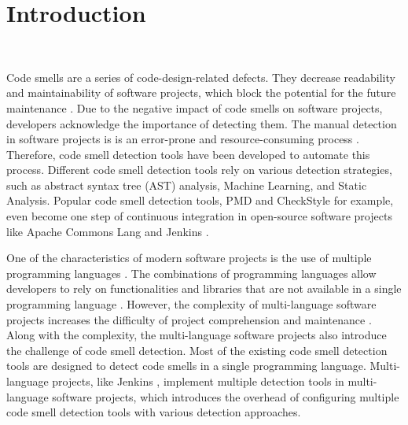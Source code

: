 \section{Introduction}~\label{sec:introduction}


Code smells are a series of code-design-related defects. They decrease
readability \cite{5741260} and maintainability \cite{6392174,6405287} of
software projects, which block the potential for the future maintenance
\cite{Fowler_Beck}. Due to the negative impact of code smells on software
projects, developers acknowledge the importance of detecting them. The manual
detection in software projects is is an error-prone and resource-consuming
process \cite{DetectingDefectsInObject}. Therefore, code smell detection tools
have been developed to automate this process. Different code smell detection
tools rely on various detection strategies, such as abstract syntax tree (AST)
analysis, Machine Learning, and Static Analysis. Popular code smell detection
tools, PMD \cite{PMD} and CheckStyle \cite{CheckStyle} for example, even become
one step of continuous integration in open-source software projects like Apache
Commons Lang \cite{ApacheCommonsLang} and Jenkins \cite{Jekins}.

One of the characteristics of modern software projects is the use of multiple
programming languages \cite{723183}. The combinations of programming languages
allow developers to rely on functionalities and libraries that are not available
in a single programming language \cite{7476675}. However, the complexity of
multi-language software projects increases the difficulty of project
comprehension and maintenance \cite{7476675, 10.1109/SCAM.2012.11, 7396422}.
Along with the complexity, the multi-language software projects also introduce
the challenge of code smell detection. Most of the existing code smell detection
tools are designed to detect code smells in a single programming language.
Multi-language projects, like Jenkins \cite{Jekins}, implement multiple
detection tools in multi-language software projects, which introduces the
overhead of configuring multiple code smell detection tools with various
detection approaches.

